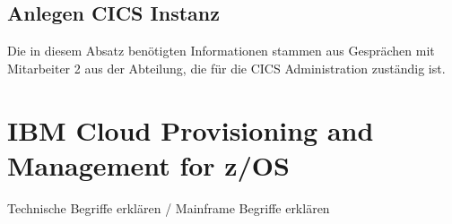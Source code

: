 \subsection{Anlegen CICS Instanz}\label{subsec:createCICS}
Die in diesem Absatz benötigten Informationen stammen aus Gesprächen mit Mitarbeiter 2 aus der Abteilung, die für die CICS Administration zuständig ist.

\section{IBM Cloud Provisioning and Management for z/OS}\label{sec:zosmf}

Technische Begriffe erklären / Mainframe Begriffe erklären

